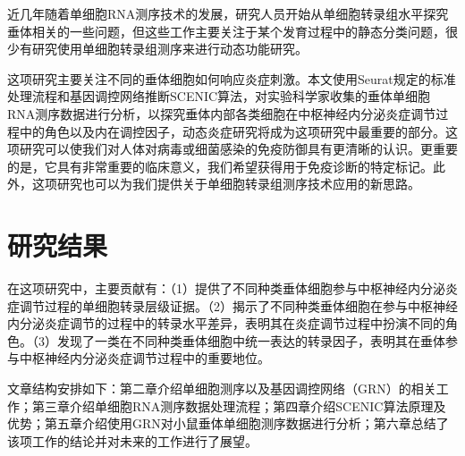   近几年随着单细胞RNA测序技术的发展\cite{svensson2018exponential}，研究人员开始从单细胞转录组水平探究垂体相关的一些问题\cite{chen2020single,cheung2018single,ho2020single,fletcher2019cell}，但这些工作主要关注于某个发育过程中的静态分类问题，很少有研究使用单细胞转录组测序来进行动态功能研究。

  这项研究主要关注不同的垂体细胞如何响应炎症刺激。本文使用Seurat\cite{butler2018integrating,stuart2019comprehensive}规定的标准处理流程和基因调控网络推断SCENIC\cite{aibar2017scenic,van2020scalable}算法，对实验科学家收集的垂体单细胞RNA测序数据进行分析，以探究垂体内部各类细胞在中枢神经内分泌炎症调节过程中的角色以及内在调控因子，动态炎症研究将成为这项研究中最重要的部分。这项研究可以使我们对人体对病毒或细菌感染的免疫防御具有更清晰的认识。更重要的是，它具有非常重要的临床意义，我们希望获得用于免疫诊断的特定标记。此外，这项研究也可以为我们提供关于单细胞转录组测序技术应用的新思路。

\section{研究结果}
  在这项研究中，主要贡献有：（1）提供了不同种类垂体细胞参与中枢神经内分泌炎症调节过程的单细胞转录层级证据。（2）揭示了不同种类垂体细胞在参与中枢神经内分泌炎症调节的过程中的转录水平差异，表明其在炎症调节过程中扮演不同的角色。（3）发现了一类在不同种类垂体细胞中统一表达的转录因子，表明其在垂体参与中枢神经内分泌炎症调节过程中的重要地位。

  文章结构安排如下：第二章介绍单细胞测序以及基因调控网络（GRN）的相关工作；第三章介绍单细胞RNA测序数据处理流程；第四章介绍SCENIC算法原理及优势；第五章介绍使用GRN对小鼠垂体单细胞测序数据进行分析；第六章总结了该项工作的结论并对未来的工作进行了展望。

